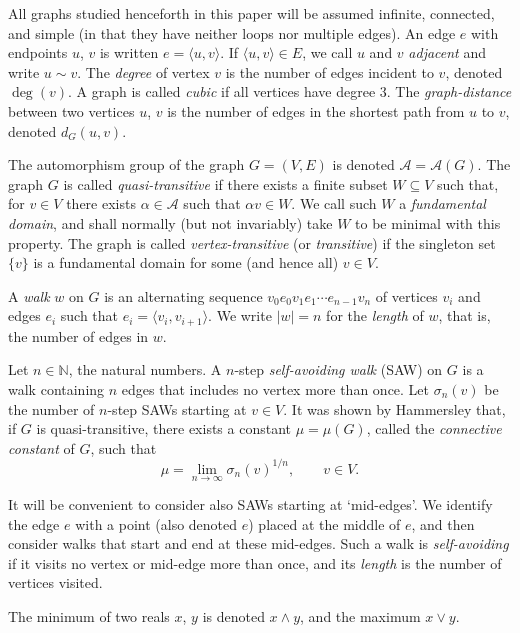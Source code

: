 \documentclass[12pt]{amsart}
\theoremstyle{plain}
\numberwithin{equation}{section}
\numberwithin{theorem}{section}
\numberwithin{figure}{section}
\newcommand\s{\sigma}
\newcommand\oo{\infty}
\newcommand\NN{{\mathbb N}}
\newcommand\sA{{\mathcal A}}
\renewcommand\a{\alpha}
\begin{document}
All graphs studied henceforth in this paper will be assumed infinite, connected,
and simple (in that they have neither loops nor multiple edges). 
An edge $e$ with endpoints $u$, $v$ is written $e=\langle u,v \rangle$.
If $\langle u,v \rangle \in E$, we call $u$ and $v$ \emph{adjacent}
and write $u \sim v$.
The \emph{degree} of vertex $v$ is the number of edges
incident to $v$, denoted $\deg(v)$. A graph is called \emph{cubic}
if all vertices have degree $3$.
The \emph{graph-distance} between two vertices $u$, $v$ is the number of edges
in the shortest path from $u$ to $v$, denoted $d_G(u,v)$.

The automorphism group of the graph $G=(V,E)$ is
denoted $\sA=\sA(G)$.
The graph $G$ is
called \emph{quasi-transitive} if there exists a finite subset $W \subseteq V$ such that,
for $v \in V$ there exists $\a\in\sA $ such
that $\a v \in W$. We call such $W$ a \emph{fundamental domain},
and shall normally (but not invariably) take $W$
to be minimal with this property. The graph is 
called \emph{vertex-transitive} 
(or \emph{transitive}) if the singleton set $\{v\}$ is a fundamental
domain for some (and hence all) $v \in V$.


A \emph{walk} $w$ on $G$ is
an alternating sequence $v_0e_0v_1e_1\cdots e_{n-1} v_n$ of vertices $v_i$
and edges $e_i$ such that $e_i=\langle v_i, v_{i+1}\rangle$.
We write $|w|=n$ for the \emph{length} of $w$, that is, the number of edges in $w$.

Let $n \in \NN$, the natural numbers. 
A $n$-step \emph{self-avoiding walk} (SAW) 
on $G$ is  a walk containing $n$ edges
that includes no vertex more than once.
Let $\s_n(v)$ be the number of $n$-step SAWs 
 starting at $v\in V$. It was shown by Hammersley \cite{jmhII}
that, if $G$ is quasi-transitive, there exists a constant $\mu=\mu(G)$,
called the \emph{connective constant} of $G$,
such that
\begin{equation}
\label{connconst}
\mu= \lim_{n\to\oo}  \s_n(v)^{1/n}, \qquad v \in V.
\end{equation}

It will be convenient to consider also SAWs starting at `mid-edges'. We identify the
edge $e$ with a point (also denoted $e$) placed at the middle of $e$, 
and then consider walks that start and end at 
these mid-edges. Such a  walk is \emph{self-avoiding} if it visits no vertex or mid-edge 
more than once, and its \emph{length} is the number of vertices visited.

The minimum of two reals $x$, $y$ is denoted $x \wedge y$, and the maximum
$x \vee y$.
\end{document}
